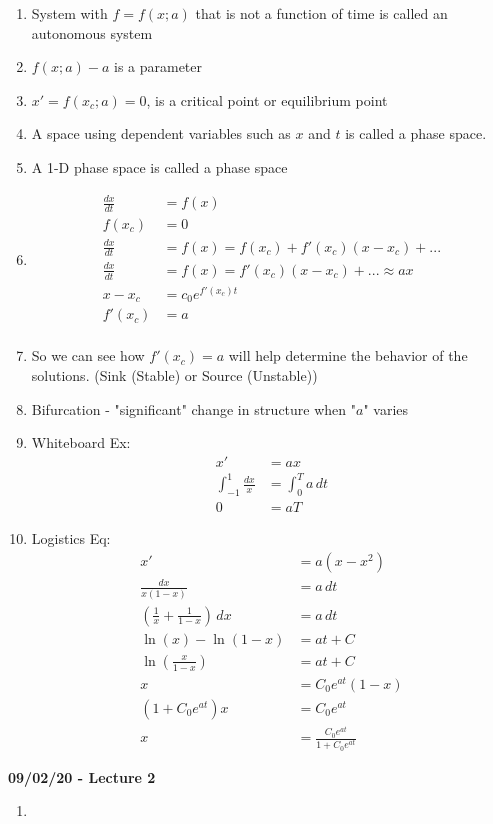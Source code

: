 \documentclass[11pt]{article}
\newcommand{\skipline}{\vspace{\baselineskip}}
\begin{document}
	\begin{enumerate}
		\item System with $f = f(x;a)$ that is not a function of time is called an autonomous system
		\item $f(x;a) - a$ is a parameter
		\item $x' = f(x_c;a) = 0$, is a critical point or equilibrium point  
		\item A space using dependent variables such as $x$ and $t$ is called a phase space. 
		\item A 1-D phase space is called a phase space
		\item 
		\begin{align*}
			\frac{dx}{dt} &= f(x) \\
			f(x_c) &= 0	\\
			\frac{dx}{dt} &= f(x) = f(x_c) + f'(x_c)(x - x_c) + ... \\
			\frac{dx}{dt} &= f(x) = f'(x_c)(x - x_c) + ... \approx ax \\
			x - x_c &= c_0e^{f'(x_c)t} \\
			f'(x_c) &= a \\
		\end{align*}
		\item So we can see how $f'(x_c) = a$ will help determine the behavior of the solutions. (Sink (Stable) or Source (Unstable))
		\item Bifurcation - "significant" change in structure when "$a$" varies
		\item Whiteboard Ex:
		\begin{align*}
			x' &= ax \\
			\int_{-1}^{1} \frac{dx}{x} &= \int_{0}^{T} a\,dt \\
			0 &= aT
		\end{align*}
		\item Logistics Eq:
		\begin{align*}
			x' &= a(x - x^2) \\
			\frac{dx}{x(1-x)} &= a\,dt \\
			\left(\frac{1}{x} + \frac{1}{1 - x}\right)\,dx &= a\,dt \\
			\ln(x) - \ln(1-x) &= at + C \\
			\ln\left(\frac{x}{1-x}\right) &= at + C \\
			x &= C_0e^{at}(1-x) \\
			(1 + C_0e^{at})x &= C_0e^{at} \\
			x &= \frac{C_0e^{at}}{1 + C_0e^{at}}
		\end{align*}
	\end{enumerate}
	\skipline
	\textbf{09/02/20 - Lecture 2}
	\begin{enumerate}
		\item 
	\end{enumerate}

	
\end{document}
